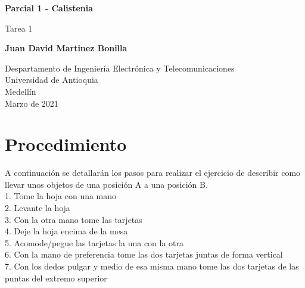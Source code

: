 \documentclass{article}
\begin{document}
\begin{titlepage}
    \begin{center}
        \vspace*{1cm}
            
        \Huge
        \textbf{Parcial 1 - Calistenia}
            
        \vspace{0.5cm}
        \LARGE
        Tarea 1
            
        \vspace{5cm}
            
        \textbf{Juan David Martinez Bonilla}
            
        \vfill
            
        \vspace{0.8cm}
            
        \Large
        Despartamento de Ingeniería Electrónica y Telecomunicaciones\\
        Universidad de Antioquia\\
        Medellín\\
        Marzo de 2021
            
    \end{center}
\end{titlepage}


\newpage
\section{Procedimiento}
A continuación se detallarán los pasos para realizar el ejercicio
de describir como llevar unos objetos de una posición A a una posición B.\\


1.	Tome la hoja con una mano\\


2.	Levante la hoja\\


3.	Con la otra mano tome las tarjetas\\


4.	Deje la hoja encima de la mesa\\


5.	Acomode/pegue las tarjetas la una con la otra\\


6.	Con la mano de preferencia tome las dos tarjetas juntas de forma vertical\\


7.	Con los dedos pulgar y medio de esa misma mano tome las dos tarjetas de las puntas del extremo superior\\
\end{document}
